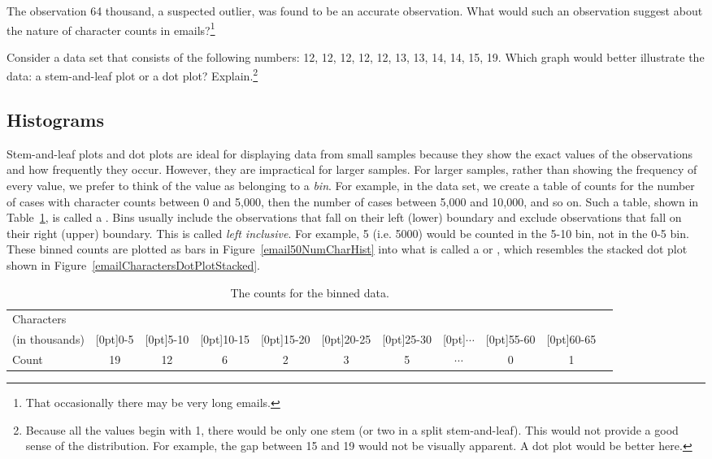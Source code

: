 \begin{exercise}
The observation 64 thousand, a suspected outlier, was found to be an accurate observation. What would such an observation suggest about the nature of character counts in emails?\footnote{That occasionally there may be very long emails.}\end{exercise}

\begin{exercise}
Consider a data set that consists of the following numbers:  12, 12, 12, 12, 12, 13, 13, 14, 14, 15, 19. Which graph would better illustrate the data: a stem-and-leaf plot or a dot plot? Explain.\footnote{Because all the values begin with 1, there would be only one stem (or two in a split stem-and-leaf). This would not provide a good sense of the distribution. For example, the gap between 15 and 19 would not be visually apparent. A dot plot would be better here.}
\end{exercise}


\subsection{Histograms}
\label{histogramsAndShape}

Stem-and-leaf plots and dot plots are ideal for displaying data from small samples because they show the exact values of the observations and how frequently they occur. However, they are impractical for larger samples. For larger samples, rather than showing the frequency of every value, we prefer to think of the value as belonging to a \emph{bin}. For example, in the  data set, we create a table of counts for the number of cases with character counts between 0 and 5,000, then the number of cases between 5,000 and 10,000, and so on. Such a table, shown in Table~\ref{binnedNumCharTable}, is called a . Bins usually include the observations that fall on their left (lower) boundary and exclude observations that fall on their right (upper) boundary.  This is called \emph{left inclusive}. For example, 5 (i.e. 5000) would be counted in the 5-10 bin, not in the 0-5 bin.  These binned counts are plotted as bars in Figure~\ref{email50NumCharHist} into what is called a  or , which resembles the stacked dot plot shown in Figure~\ref{emailCharactersDotPlotStacked}.

\begin{table}[ht]
\centering\small
\begin{tabular}{l ccc ccc ccc c}
  \hline
Characters & \\
(in thousands) & \raisebox{1.5ex}[0pt]{0-5} & \raisebox{1.5ex}[0pt]{5-10} & \raisebox{1.5ex}[0pt]{10-15} & \raisebox{1.5ex}[0pt]{15-20} & \raisebox{1.5ex}[0pt]{20-25} & \raisebox{1.5ex}[0pt]{25-30} & \raisebox{1.5ex}[0pt]{$\cdots$} & \raisebox{1.5ex}[0pt]{55-60} & \raisebox{1.5ex}[0pt]{60-65} \\
  \hline
Count & 19 & 12 & 6 & 2 & 3 & 5 & $\cdots$ & 0 & 1 \\
  \hline
\end{tabular}
\caption{The counts for the binned  data.}
\label{binnedNumCharTable}
\end{table}

